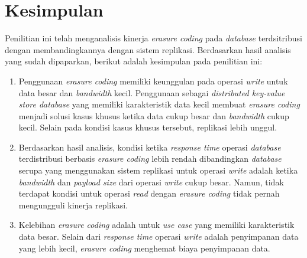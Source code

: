 \section{Kesimpulan}
\label{sec:kesimpulan}

Penilitian ini telah menganalisis kinerja \textit{erasure coding} pada \textit{database} terdsitribusi dengan membandingkannya dengan sistem replikasi. Berdasarkan hasil analisis yang sudah dipaparkan, berikut adalah kesimpulan pada penilitian ini:

\begin{enumerate}
	\item Penggunaan \textit{erasure coding} memiliki keunggulan pada operasi \textit{write} untuk data besar dan \textit{bandwidth} kecil. Penggunaan sebagai \textit{distributed key-value store database} yang memiliki karakteristik data kecil membuat \textit{erasure coding} menjadi solusi kasus khusus ketika data cukup besar dan \textit{bandwidth} cukup kecil. Selain pada kondisi kasus khusus tersebut, replikasi lebih unggul.
	\item Berdasarkan hasil analisis, kondisi ketika \textit{response time} operasi \textit{database} terdistribusi berbasis \textit{erasure coding} lebih rendah dibandingkan \textit{database} serupa yang menggunakan sistem replikasi untuk operasi \textit{write} adalah ketika \textit{bandwidth} dan \textit{payload size} dari operasi \textit{write} cukup besar. Namun, tidak terdapat kondisi untuk operasi \textit{read} dengan \textit{erasure coding} tidak pernah mengungguli kinerja replikasi.
	\item Kelebihan \textit{erasure coding} adalah untuk \textit{use case} yang memiliki karakteristik data besar. Selain dari \textit{response time} operasi \textit{write} adalah penyimpanan data yang lebih kecil, \textit{erasure coding} menghemat biaya penyimpanan data.
\end{enumerate}
